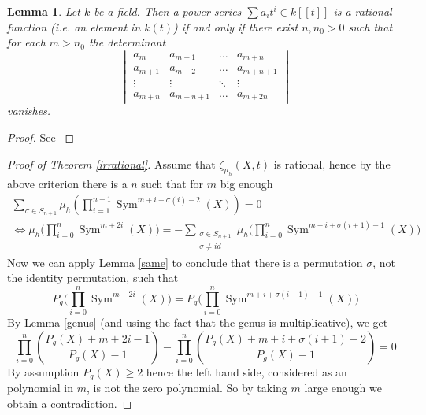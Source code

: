 \documentclass[11pt, a4paper, german]{article}
\theoremstyle{plain}
\newtheorem{lemma}[theorem]{Lemma}
\theoremstyle{definition}
\DeclareMathOperator{\Sym}{Sym}
\begin{document}
\begin{lemma}
    Let $k$ be a field. Then a power series $\sum a_it^i \in k[[t]]$  is a rational function (i.e. an element in $k(t)$) if and only if
    there exist $n, n_0 > 0$ such that for each $m > n_0$ the determinant
    \[
        \begin{vmatrix}
            a_m     & a_{m+1} & \dots & a_{m+n} \\
            a_{m+1} & a_{m+2} & \dots & a_{m+n+1} \\
            \vdots  & \vdots  & \ddots & \vdots \\
            a_{m+n} & a_{m+n+1} & \dots & a_{m+2n}
        \end{vmatrix}
    \]
    vanishes.
\end{lemma}
\begin{proof}
    See \cite[Section 5.3, Lem. 1]{MR0241425}
\end{proof}

\begin{proof}[Proof of Theorem \ref{irrational}]
    Assume that $\zeta_{\mu_h}(X,t)$ is rational, hence by the above criterion there is a $n$ such that for $m$ big enough
    \begin{equation}
        \begin{split}
            \sum_{\sigma \in S_{n+1}} \mu_h ( \prod_{i=1}^{n+1} \Sym^{m + i + \sigma(i) - 2}(X)) = 0  \\
        \Leftrightarrow
        \mu_h \Big ( \prod_{i=0}^n \Sym^{m + 2i}(X) \Big ) = - \sum_{\substack{\sigma \in S_{n+1} \\ \sigma \neq id}} 
        \mu_h \Big ( \prod_{i=0}^n \Sym^{m + i + \sigma(i+1) - 1}(X) \Big )
    \end{split}
    \end{equation}
    Now we can apply Lemma \ref{same} to conclude that there is a permutation $\sigma$, not the identity permutation, such that
    \[
        P_g \Big(\prod_{i=0}^n \Sym^{m+2i}(X)\Big) = P_g \Big( \prod_{i=0}^n \Sym^{m+i+\sigma(i+1) - 1}(X) \Big)
    \]
    By Lemma \ref{genus} (and using the fact that the genus is multiplicative), we get
    \[
        \prod_{i=0}^n \binom{P_g(X) + m + 2i - 1}{P_g(X) - 1} - \prod_{i=0}^n \binom{P_g(X) + m + i + \sigma(i+1) - 2}{P_g(X) - 1} = 0
    \]
    By assumption $P_g(X) \geq 2$ hence the left hand side, considered as an polynomial in $m$, is not the zero polynomial. So by taking
    $m$ large enough we obtain a contradiction.
\end{proof}




{}

\end{document}
